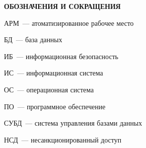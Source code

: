 \begin{center}
  \Large{\textbf{ОБОЗНАЧЕНИЯ И СОКРАЩЕНИЯ}}
\end{center}

АРМ~--- атоматизированное рабочее место

БД~--- база данных

ИБ~--- информационная безопасность

ИС~--- информационная система

ОС~--- операционная система

ПО~--- программное обеспечение

СУБД~--- система управления базами данных

НСД~--- несанкционированный доступ
